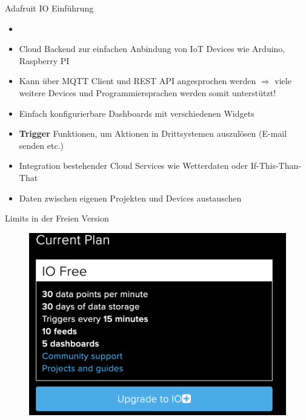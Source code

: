 \begin{frame}{Adafruit IO Einführung}
 \begin{itemize}
        \setlength{\itemindent}{1.4in}
        \item [\textbf{Adafruit IO Einführung}]
    \end{itemize}
    \begin{itemize}
        \item Cloud Backend zur einfachen Anbindung von IoT Devices wie Arduino, Raspberry PI
        \item Kann über MQTT Client und REST  API angesprochen werden  $\Rightarrow$ viele weitere Devices und Programmiersprachen werden somit unterstützt!
        \item Einfach konfigurierbare Dashboards mit verschiedenen Widgets
        \item \textbf{Trigger} Funktionen, um Aktionen in Drittsystemen auszulösen (E-mail senden etc.)
        \item Integration bestehender Cloud Services wie Wetterdaten oder If-This-Than-That
        \item Daten zwischen eigenen Projekten und Devices austauschen
    \end{itemize}    
\end{frame}


\begin{frame}{Limits in der Freien Version}

  \begin{figure}[!htb]
  \hspace*{5mm}
        \includegraphics[scale=0.6]{7-datenaustausch/img/adafruit-limits} 
    \end{figure}
\end{frame}

